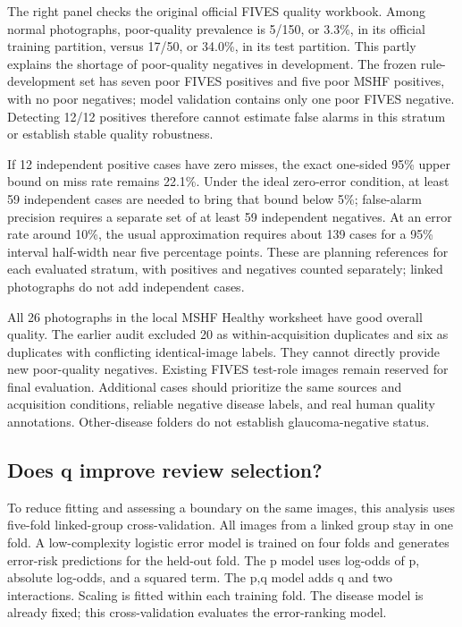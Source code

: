 \documentclass[
  10pt,
]{article}
\begin{document}
The right panel checks the original official FIVES quality workbook.
Among normal photographs, poor-quality prevalence is 5/150, or 3.3\%, in
its official training partition, versus 17/50, or 34.0\%, in its test
partition. This partly explains the shortage of poor-quality negatives
in development. The frozen rule-development set has seven poor FIVES
positives and five poor MSHF positives, with no poor negatives; model
validation contains only one poor FIVES negative. Detecting 12/12
positives therefore cannot estimate false alarms in this stratum or
establish stable quality robustness.

If 12 independent positive cases have zero misses, the exact one-sided
95\% upper bound on miss rate remains 22.1\%. Under the ideal zero-error
condition, at least 59 independent cases are needed to bring that bound
below 5\%; false-alarm precision requires a separate set of at least 59
independent negatives. At an error rate around 10\%, the usual
approximation requires about 139 cases for a 95\% interval half-width
near five percentage points. These are planning references for each
evaluated stratum, with positives and negatives counted separately;
linked photographs do not add independent cases.

All 26 photographs in the local MSHF Healthy worksheet have good overall
quality. The earlier audit excluded 20 as within-acquisition duplicates
and six as duplicates with conflicting identical-image labels. They
cannot directly provide new poor-quality negatives. Existing FIVES
test-role images remain reserved for final evaluation. Additional cases
should prioritize the same sources and acquisition conditions, reliable
negative disease labels, and real human quality annotations.
Other-disease folders do not establish glaucoma-negative status.

\subsection{Does q improve review
selection?}\label{does-q-improve-review-selection}

To reduce fitting and assessing a boundary on the same images, this
analysis uses five-fold linked-group cross-validation. All images from a
linked group stay in one fold. A low-complexity logistic error model is
trained on four folds and generates error-risk predictions for the
held-out fold. The p model uses log-odds of p, absolute log-odds, and a
squared term. The p,q model adds q and two interactions. Scaling is
fitted within each training fold. The disease model is already fixed;
this cross-validation evaluates the error-ranking model.
\end{document}

